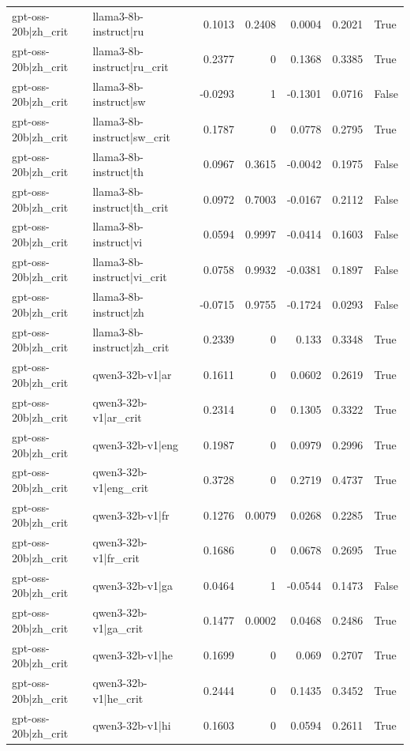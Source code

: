 \begin{table}
\begin{tabular}{l l r r r r l}
gpt-oss-20b|zh_crit & llama3-8b-instruct|ru & 0.1013 & 0.2408 & 0.0004 & 0.2021 & True \\
gpt-oss-20b|zh_crit & llama3-8b-instruct|ru_crit & 0.2377 & 0 & 0.1368 & 0.3385 & True \\
gpt-oss-20b|zh_crit & llama3-8b-instruct|sw & -0.0293 & 1 & -0.1301 & 0.0716 & False \\
gpt-oss-20b|zh_crit & llama3-8b-instruct|sw_crit & 0.1787 & 0 & 0.0778 & 0.2795 & True \\
gpt-oss-20b|zh_crit & llama3-8b-instruct|th & 0.0967 & 0.3615 & -0.0042 & 0.1975 & False \\
gpt-oss-20b|zh_crit & llama3-8b-instruct|th_crit & 0.0972 & 0.7003 & -0.0167 & 0.2112 & False \\
gpt-oss-20b|zh_crit & llama3-8b-instruct|vi & 0.0594 & 0.9997 & -0.0414 & 0.1603 & False \\
gpt-oss-20b|zh_crit & llama3-8b-instruct|vi_crit & 0.0758 & 0.9932 & -0.0381 & 0.1897 & False \\
gpt-oss-20b|zh_crit & llama3-8b-instruct|zh & -0.0715 & 0.9755 & -0.1724 & 0.0293 & False \\
gpt-oss-20b|zh_crit & llama3-8b-instruct|zh_crit & 0.2339 & 0 & 0.133 & 0.3348 & True \\
gpt-oss-20b|zh_crit & qwen3-32b-v1|ar & 0.1611 & 0 & 0.0602 & 0.2619 & True \\
gpt-oss-20b|zh_crit & qwen3-32b-v1|ar_crit & 0.2314 & 0 & 0.1305 & 0.3322 & True \\
gpt-oss-20b|zh_crit & qwen3-32b-v1|eng & 0.1987 & 0 & 0.0979 & 0.2996 & True \\
gpt-oss-20b|zh_crit & qwen3-32b-v1|eng_crit & 0.3728 & 0 & 0.2719 & 0.4737 & True \\
gpt-oss-20b|zh_crit & qwen3-32b-v1|fr & 0.1276 & 0.0079 & 0.0268 & 0.2285 & True \\
gpt-oss-20b|zh_crit & qwen3-32b-v1|fr_crit & 0.1686 & 0 & 0.0678 & 0.2695 & True \\
gpt-oss-20b|zh_crit & qwen3-32b-v1|ga & 0.0464 & 1 & -0.0544 & 0.1473 & False \\
gpt-oss-20b|zh_crit & qwen3-32b-v1|ga_crit & 0.1477 & 0.0002 & 0.0468 & 0.2486 & True \\
gpt-oss-20b|zh_crit & qwen3-32b-v1|he & 0.1699 & 0 & 0.069 & 0.2707 & True \\
gpt-oss-20b|zh_crit & qwen3-32b-v1|he_crit & 0.2444 & 0 & 0.1435 & 0.3452 & True \\
gpt-oss-20b|zh_crit & qwen3-32b-v1|hi & 0.1603 & 0 & 0.0594 & 0.2611 & True \\

\end{tabular}
\end{table}
